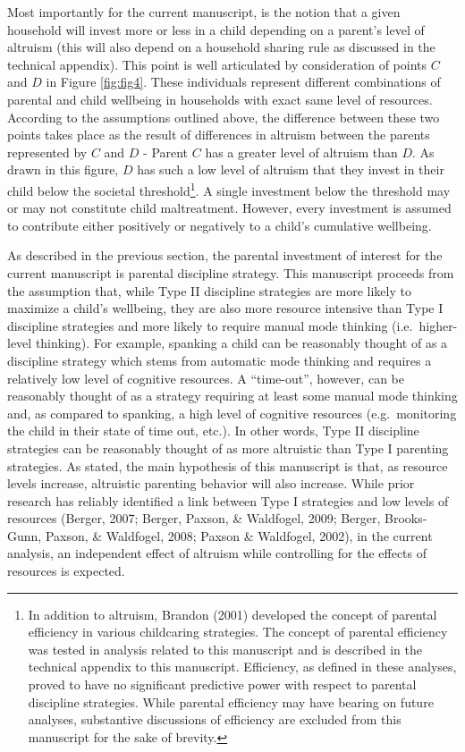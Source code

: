 \documentclass[review]{elsarticle}\usepackage[]{graphicx}\usepackage[]{color}
\begin{document}
Most importantly for the current manuscript, is the notion that a given
household will invest more or less in a child depending on a parent's
level of altruism (this will also depend on a household sharing rule as
discussed in the technical appendix). This point is well articulated by
consideration of points $C$ and $D$ in Figure \ref{fig:fig4}. These individuals
represent different combinations of parental and child wellbeing in
households with exact same level of resources. According to the
assumptions outlined above, the difference between these two points
takes place as the result of differences in altruism between the parents
represented by $C$ and $D$ - Parent $C$ has a greater level of altruism
than $D$. As drawn in this figure, $D$ has such a low level of altruism
that they invest in their child below the societal threshold\footnote{In
  addition to altruism, Brandon (2001) developed the concept of parental
  efficiency in various childcaring strategies. The concept of parental
  efficiency was tested in analysis related to this manuscript and is
  described in the technical appendix to this manuscript. Efficiency, as
  defined in these analyses, proved to have no significant predictive
  power with respect to parental discipline strategies. While parental
  efficiency may have bearing on future analyses, substantive
  discussions of efficiency are excluded from this manuscript for the
  sake of brevity.}. A single investment below the threshold may or may
not constitute child maltreatment. However, every investment is assumed
to contribute either positively or negatively to a child's cumulative
wellbeing.

As described in the previous section, the parental investment of
interest for the current manuscript is parental discipline strategy.
This manuscript proceeds from the assumption that, while Type II
discipline strategies are more likely to maximize a child's wellbeing,
they are also more resource intensive than Type I discipline strategies
and more likely to require manual mode thinking (i.e.~higher-level
thinking). For example, spanking a child can be reasonably thought of as
a discipline strategy which stems from automatic mode thinking and
requires a relatively low level of cognitive resources. A ``time-out'',
however, can be reasonably thought of as a strategy requiring at least
some manual mode thinking and, as compared to spanking, a high level of
cognitive resources (e.g.~monitoring the child in their state of time
out, etc.). In other words, Type II discipline strategies can be
reasonably thought of as more altruistic than Type I parenting
strategies. As stated, the main hypothesis of this manuscript is that,
as resource levels increase, altruistic parenting behavior will also
increase. While prior research has reliably identified a link between
Type I strategies and low levels of resources (Berger, 2007; Berger, Paxson, \& Waldfogel, 2009; Berger, Brooks-Gunn, Paxson, \&
Waldfogel, 2008; Paxson \& Waldfogel, 2002), in the current analysis, an
independent effect of altruism while controlling for the effects of
resources is expected.
\end{document}
